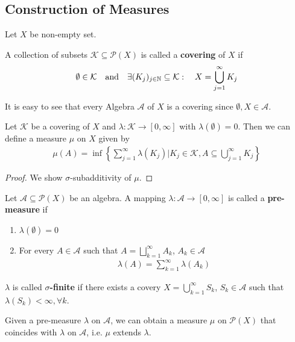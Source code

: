 \subsection{Construction of Measures}
Let $X$ be non-empty set.

\begin{dfn}[]
  A collection of subsets $\mathcal{K} \subseteq \mathcal{P}(X)$ is called a \textbf{covering} of $X$ if
  \begin{align*}
    \emptyset \in \mathcal{K} \quad \text{and} \quad \exists (K_j)_{j \in \mathbb{N}} \subseteq \mathcal{K}: \quad X = \bigcup_{j=1}^{\infty}K_j
  \end{align*}
\end{dfn}
It is easy to see that every Algebra $\mathcal{A}$ of $X$ is a covering since $\emptyset,X \in \mathcal{A}$.
\begin{thm}[]
  Let $\mathcal{K}$ be a covering of $X$ and $\lambda: \mathcal{K} \to [0,\infty]$ with $\lambda(\emptyset) = 0$. Then we can define a measure $\mu$ on $X$ given by
  \begin{align*}
    \mu(A) = \inf \left\{
      \sum_{j=1}^{\infty}\lambda(K_j) \big\vert
      K_j \in \mathcal{K}, A \subseteq \bigcup_{j=1}^{\infty}K_j
    \right\}
  \end{align*}
\end{thm}
\begin{proof}
  We show $\sigma$-subadditivity of $\mu$.
\end{proof}
\begin{dfn}[]
  Let $\mathcal{A}\subseteq \mathcal{P}(X)$ be an algebra. A mapping $\lambda: \mathcal{A} \to [0,\infty]$ is called a \textbf{pre-measure} if
  \begin{enumerate}
    \item $\lambda(\emptyset) = 0$
    \item For every $A \in \mathcal{A}$ such that $A = \bigsqcup_{k=1}^{\infty}A_k$, $A_k \in \mathcal{A}$ 
      \begin{align*}
        \lambda(A) = \sum_{k=1}^{\infty}\lambda(A_k)
      \end{align*}
  \end{enumerate}
  $\lambda$ is called \textbf{$\sigma$-finite} if there exists a covery $X = \bigcup_{k=1}^{\infty}S_k$, $S_k \in \mathcal{A}$ such that $\lambda(S_k) < \infty, \forall k$.
\end{dfn}
Given a pre-measure $\lambda$ on $\mathcal{A}$, we can obtain a measure $\mu$ on $\mathcal{P}(X)$ that coincides with $\lambda$ on $\mathcal{A}$, i.e. $\mu$ extends $\lambda$.

